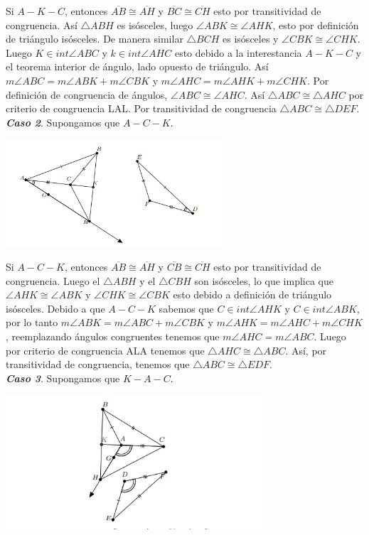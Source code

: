 \documentclass{report}
\begin{document}
    Si $A - K - C$, entonces $\overline{AB} \cong \overline{AH}$ y $\overline{BC} \cong \overline{CH}$ esto por transitividad de congruencia. Así $\triangle ABH$ es isósceles, luego $\angle ABK \cong \angle AHK$, esto por definición de triángulo isósceles. De manera similar $\triangle BCH$ es isósceles y $\angle CBK \cong \angle CHK$. Luego $K \in int\angle ABC$ y $k \in int\angle AHC$ esto debido a la interestancia $A - K - C$ y el teorema interior de ángulo, lado opuesto de triángulo. Así $m\angle ABC = m\angle ABK + m\angle CBK$ y $m\angle AHC = m\angle AHK + m\angle CHK$. Por definición de congruencia de ángulos, $\angle ABC \cong \angle AHC$. Así $\triangle ABC \cong \triangle AHC$ por criterio de congruencia LAL. Por transitividad de congruencia $\triangle ABC \cong \triangle DEF$.\\

    \textit{\textbf{Caso 2}}. Supongamos que $A - C - K$.
    \begin{center}
        \includegraphics[height=4cm]{images/caso2.png}
    \end{center}

    Si $A - C - K$, entonces $\overline{AB} \cong \overline{AH}$ y $\overline{CB} \cong \overline{CH}$ esto por transitividad de congruencia. Luego el $\triangle ABH$ y el $\triangle CBH$ son isósceles, lo que implica que $\angle AHK \cong \angle ABK$ y $\angle CHK \cong \angle CBK$ esto debido a definición de triángulo isósceles. Debido a que $A - C - K$ sabemos que $C \in int\angle AHK$ y $C \in int\angle ABK$, por lo tanto $m\angle ABK = m\angle ABC + m\angle CBK$ y $m\angle AHK = m\angle AHC + m\angle CHK$, reemplazando ángulos congruentes tenemos que $m\angle AHC = m\angle ABC$. Luego por criterio de congruencia ALA tenemos que $\triangle AHC \cong \triangle ABC$. Así, por transitividad de congruencia, tenemos que $\triangle ABC \cong \triangle EDF$.\\


    \textit{\textbf{Caso 3}}. Supongamos que $K - A - C$.
    \begin{center}
        \includegraphics[height=5cm]{images/caso3.png}
    \end{center}
\end{document}
